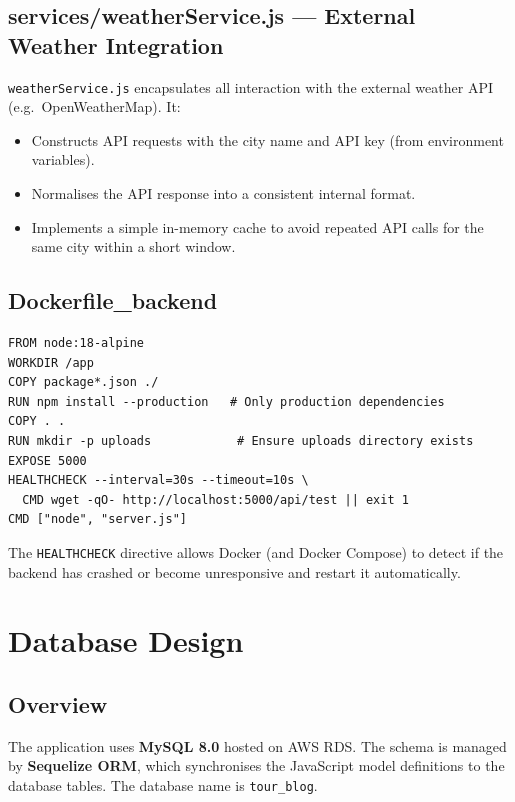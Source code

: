 \documentclass[12pt,a4paper]{report}
\begin{document}
\section{services/weatherService.js --- External Weather Integration}

\texttt{weatherService.js} encapsulates all interaction with the external weather API (e.g.\ OpenWeatherMap). It:
\begin{itemize}[leftmargin=2em]
  \item Constructs API requests with the city name and API key (from environment variables).
  \item Normalises the API response into a consistent internal format.
  \item Implements a simple in-memory cache to avoid repeated API calls for the same city within a short window.
\end{itemize}

\section{Dockerfile\_backend}

\begin{lstlisting}[caption={Backend Dockerfile (simplified)}]
FROM node:18-alpine
WORKDIR /app
COPY package*.json ./
RUN npm install --production   # Only production dependencies
COPY . .
RUN mkdir -p uploads            # Ensure uploads directory exists
EXPOSE 5000
HEALTHCHECK --interval=30s --timeout=10s \
  CMD wget -qO- http://localhost:5000/api/test || exit 1
CMD ["node", "server.js"]
\end{lstlisting}

The \texttt{HEALTHCHECK} directive allows Docker (and Docker Compose) to detect if the backend has crashed or become unresponsive and restart it automatically.

\chapter{Database Design}

\section{Overview}

The application uses \textbf{MySQL 8.0} hosted on AWS RDS. The schema is managed by \textbf{Sequelize ORM}, which synchronises the JavaScript model definitions to the database tables. The database name is \texttt{tour\_blog}.
\end{document}
